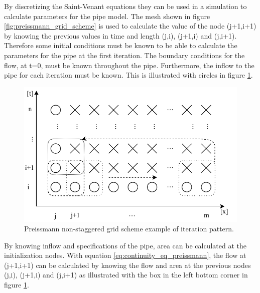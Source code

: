 By discretizing the Saint-Venant equations they can be used in a simulation to calculate parameters for the pipe model. The mesh shown in figure \ref{fig:preissmann_grid_scheme} is used to calculate the value of the node (j+1,i+1) by knowing the previous values in time and length (j,i), (j+1,i) and (j,i+1). Therefore some initial conditions must be known to be able to calculate the parameters for the pipe at the first iteration. The boundary conditions for the flow, at t=0, must be known throughout the pipe. Furthermore, the inflow to the pipe for each iteration must be known. This is illustrated with circles in figure \ref{fig:preissmann_grid_scheme_exampel}.

\begin{figure}[H]
\centering
\includegraphics[width=.75\textwidth]{report/simulation/pictures/preissmann_scheme_iteration}
\caption{Preissmann non-staggered grid scheme example of iteration pattern.}
\label{fig:preissmann_grid_scheme_exampel}
\end{figure}
By knowing inflow and specifications of the pipe, area can be calculated at the initialization nodes. With equation \ref{eq:continuity_eq_preissmann}, the flow at (j+1,i+1) can be calculated by knowing the flow and area at the previous nodes (j,i), (j+1,i) and (j,i+1) as illustrated with the box in the left bottom corner in figure \ref{fig:preissmann_grid_scheme_exampel}.



